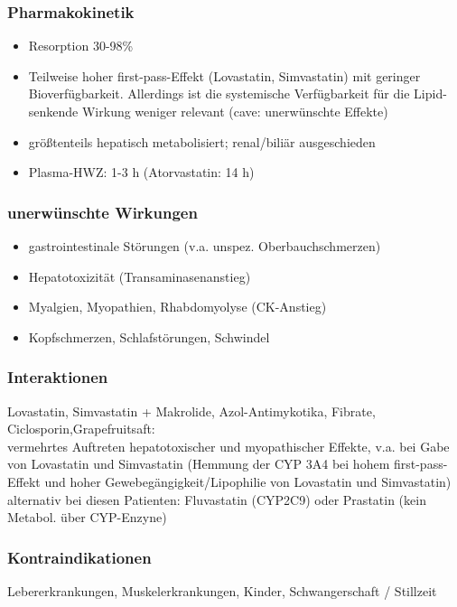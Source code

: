 \documentclass[10pt,a4paper]{report}
\begin{document}
\subsubsection{Pharmakokinetik} %
\label{par:pharmakokinetik}
\begin{itemize}
	\item Resorption 30-98\%
	\item Teilweise hoher first-pass-Effekt (Lovastatin, Simvastatin) mit geringer Bioverfügbarkeit. Allerdings ist die systemische Verfügbarkeit für die Lipid-senkende Wirkung weniger relevant (cave: unerwünschte Effekte)
	\item größtenteils hepatisch metabolisiert; renal/biliär ausgeschieden
	\item Plasma-HWZ: 1-3 h (Atorvastatin: 14 h)
\end{itemize}
\subsubsection{unerwünschte Wirkungen} %
\label{par:unerw_nschte_wirkungen}
\begin{itemize}
	\item  gastrointestinale Störungen (v.a. unspez. Oberbauchschmerzen)
	\item Hepatotoxizität (Transaminasenanstieg)
	\item Myalgien, Myopathien, Rhabdomyolyse (CK-Anstieg)
	\item Kopfschmerzen, Schlafstörungen, Schwindel
\end{itemize}
\subsubsection{Interaktionen} %
\label{par:interaktionen}
Lovastatin, Simvastatin + Makrolide, Azol-Antimykotika, Fibrate, Ciclosporin,Grapefruitsaft:\\ 
vermehrtes Auftreten hepatotoxischer und myopathischer Effekte, v.a. bei Gabe von Lovastatin und Simvastatin (Hemmung der CYP 3A4 bei hohem first-pass-Effekt und hoher Gewebegängigkeit/Lipophilie von Lovastatin und Simvastatin)\\
alternativ bei diesen Patienten: 	Fluvastatin (CYP2C9) oder Prastatin (kein Metabol. über CYP-Enzyne)
\subsubsection{Kontraindikationen} %
\label{par:kontraindikationen}
Lebererkrankungen, Muskelerkrankungen, Kinder, Schwangerschaft / Stillzeit	
\end{document}
